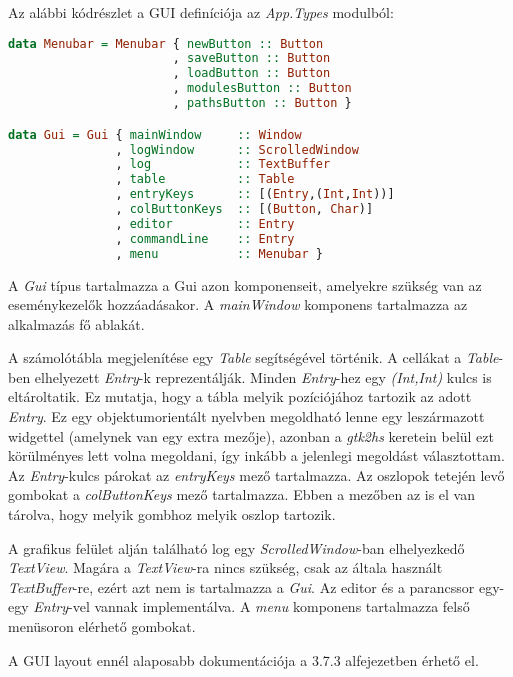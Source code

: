 Az alábbi kódrészlet a GUI definíciója az \textit{App.Types} modulból:

\begin{lstlisting}[language={Haskell}]
data Menubar = Menubar { newButton :: Button
                       , saveButton :: Button
                       , loadButton :: Button
                       , modulesButton :: Button
                       , pathsButton :: Button }

data Gui = Gui { mainWindow     :: Window
               , logWindow      :: ScrolledWindow
               , log            :: TextBuffer
               , table          :: Table
               , entryKeys      :: [(Entry,(Int,Int))]
               , colButtonKeys  :: [(Button, Char)]
               , editor         :: Entry
               , commandLine    :: Entry
               , menu           :: Menubar }
\end{lstlisting}

A \textit{Gui} típus tartalmazza a Gui azon komponenseit, amelyekre szükség van az eseménykezelők hozzáadásakor. A \textit{mainWindow} komponens tartalmazza az alkalmazás fő ablakát. 

A számolótábla megjelenítése egy \textit{Table} segítségével történik. A cellákat a \textit{Table}-ben elhelyezett \textit{Entry}-k reprezentálják. Minden \textit{Entry}-hez egy \textit{(Int,Int)} kulcs is eltároltatik. Ez mutatja, hogy a tábla melyik pozíciójához tartozik az adott \textit{Entry}. Ez egy objektumorientált nyelvben megoldható lenne egy leszármazott widgettel (amelynek van egy extra mezője), azonban a \textit{gtk2hs} keretein belül ezt körülményes lett volna megoldani, így inkább a jelenlegi megoldást választottam. Az \textit{Entry}-kulcs párokat az \textit{entryKeys} mező tartalmazza. Az oszlopok tetején levő gombokat a \textit{colButtonKeys} mező tartalmazza. Ebben a mezőben az is el van tárolva, hogy melyik gombhoz melyik oszlop tartozik.

A grafikus felület alján található log egy \textit{ScrolledWindow}-ban elhelyezkedő \textit{TextView}. Magára a \textit{TextView}-ra nincs szükség, csak az általa használt \textit{TextBuffer}-re, ezért azt nem is tartalmazza a \textit{Gui}. Az editor és a parancssor egy-egy \textit{Entry}-vel vannak implementálva. A \textit{menu} komponens tartalmazza felső menüsoron elérhető gombokat. 

A GUI layout ennél alaposabb dokumentációja a 3.7.3 alfejezetben érhető el. 

